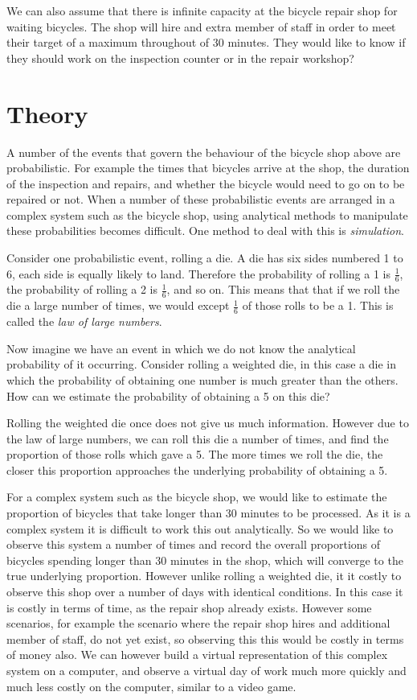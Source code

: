 We can also assume that there is infinite capacity at the bicycle repair shop
for waiting bicycles.
The shop will hire and extra member of staff in order to meet their target of a
maximum throughout of 30 minutes. They would like to know if they should work on
the inspection counter or in the repair workshop?


\section{Theory}\label{sec:theory}

A number of the events that govern the behaviour of the bicycle shop above are
probabilistic. For example the
times that bicycles arrive at the shop, the duration of the inspection and
repairs, and whether the bicycle would need to go on to be repaired or not.
When a number of these probabilistic events are arranged in a complex system
such as the bicycle shop, using analytical methods to manipulate these
probabilities becomes difficult. One method to deal with this is
\textit{simulation}.

Consider one probabilistic event, rolling a die.
A die has six sides numbered 1 to 6, each side is equally likely to land.
Therefore the probability of rolling a 1 is $\frac{1}{6}$, the probability of
rolling a 2 is $\frac{1}{6}$, and so on. This means that that if we roll the die
a large number of times, we would except $\frac{1}{6}$ of those rolls to be a 1.
This is called the \textit{law of large numbers}.

Now imagine we have an event in which we do not know the analytical probability
of it occurring. Consider rolling a weighted die, in this case a
die in which the probability of obtaining one number is much greater than the
others. How can we estimate the probability of obtaining a 5 on this die?

Rolling the weighted die once does not give us much information.
However due to the law of large numbers, we can roll this die a number of times,
and find the proportion of those rolls which gave a 5. The more times we roll
the die, the closer this proportion approaches the underlying probability of
obtaining a 5.

For a complex system such as the bicycle shop, we would like to estimate the
proportion of bicycles that take longer than 30 minutes to be processed. As it
is a complex system it is difficult to work this out analytically. So we would
like to observe this system a number of times and record the overall proportions
of bicycles spending longer than 30 minutes in the shop, which will converge to
the true underlying proportion.
However unlike rolling a weighted die, it it costly to observe this shop over a
number of days with identical conditions. In this case it is costly in terms of
time, as the repair shop already exists. However some scenarios, for example the
scenario where the repair shop hires and additional member of staff, do not yet
exist, so observing this this would be costly in terms of money also.
We can however build a virtual representation of this complex system on a
computer, and observe a virtual day of work much more quickly and much less
costly on the computer, similar to a video game.

